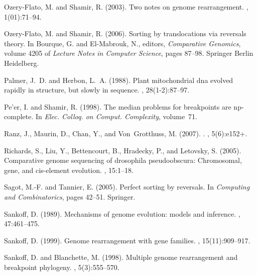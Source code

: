 \documentclass[11pt,final,twoside,nofrench]{thlifl}
\begin{document}
\begin{thebibliography}{}
Ozery-Flato, M. and Shamir, R. (2003).
\newblock Two notes on genome rearrangement.
,
  1(01):71--94.

Ozery-Flato, M. and Shamir, R. (2006).
\newblock Sorting by translocations via reversals theory.
\newblock In Bourque, G. and El-Mabrouk, N., editors, {\em Comparative
  Genomics}, volume 4205 of {\em Lecture Notes in Computer Science}, pages
  87--98. Springer Berlin Heidelberg.

Palmer, J.~D. and Herbon, L.~A. (1988).
\newblock Plant mitochondrial dna evolved rapidly in structure, but slowly in
  sequence.
, 28(1-2):87--97.

Pe’er, I. and Shamir, R. (1998).
\newblock The median problems for breakpoints are np-complete.
\newblock In {\em Elec. Colloq. on Comput. Complexity}, volume~71.

Ranz, J., Maurin, D., Chan, Y., and Von~Grotthuss, M. (2007).
.
, 5(6):e152+.

Richards, S., Liu, Y., Bettencourt, B., Hradecky, P., and Letovsky, S. (2005).
\newblock Comparative genome sequencing of drosophila pseudoobscura:
  Chromosomal, gene, and cis-element evolution.
, 15:1--18.

Sagot, M.-F. and Tannier, E. (2005).
\newblock Perfect sorting by reversals.
\newblock In {\em Computing and Combinatorics}, pages 42--51. Springer.

Sankoff, D. (1989).
\newblock Mechanisms of genome evolution: models and inference.
, 47:461--475.

Sankoff, D. (1999).
\newblock Genome rearrangement with gene families.
, 15(11):909--917.

Sankoff, D. and Blanchette, M. (1998).
\newblock Multiple genome rearrangement and breakpoint phylogeny.
, 5(3):555--570.


\end{thebibliography}
\end{document}
